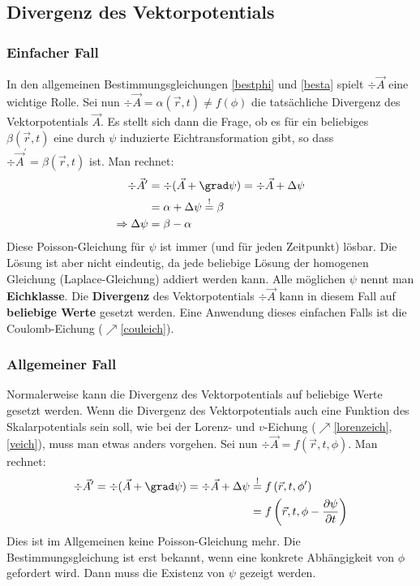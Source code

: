 \subsection{Divergenz des Vektorpotentials}
\subsubsection{Einfacher Fall}
In den allgemeinen Bestimmungsgleichungen \ref{bestphi} und \ref{besta} spielt $\div \vec{{A}}$ eine wichtige Rolle. Sei nun $\div \vec{{A}}=\alpha(\vec{{r}}, {t})\neq f(\phi)$ die tatsächliche Divergenz des Vektorpotentials $\vec{{A}}$. Es stellt sich dann die Frage, ob es für ein beliebiges $\beta(\vec{r}, t)$ eine durch $\psi$ induzierte Eichtransformation gibt, so dass $\div \vec{{A}}^{\prime}=\beta(\vec{{r}}, {t})$ ist. Man rechnet:
$$
\begin{aligned}
	 \div \vec{{A}}^{\prime}&=\div(\vec{{A}}+\grad \psi)=\div \vec{{A}}+\Delta \psi \\
	& =\alpha +\Delta \psi  \stackrel{!}{=} \beta \\
	 \Rightarrow \Delta \psi&=\beta-\alpha
\end{aligned}
$$
Diese Poisson-Gleichung für $\psi$ ist immer (und für jeden Zeitpunkt) lösbar. Die Lösung ist aber nicht eindeutig, da jede beliebige Lösung der homogenen Gleichung (Laplace-Gleichung) addiert werden kann. Alle möglichen $\psi$ nennt man \textbf{Eichklasse}. Die \textbf{Divergenz} des Vektorpotentials $\div \vec{A}$ kann in diesem Fall auf \textbf{beliebige Werte} gesetzt werden. Eine Anwendung dieses einfachen Falls ist die Coulomb-Eichung ($\nearrow$\ref{couleich}).
\subsubsection{Allgemeiner Fall}
Normalerweise kann die Divergenz des Vektorpotentials auf beliebige Werte gesetzt werden. Wenn die Divergenz des Vektorpotentials auch eine Funktion des Skalarpotentials sein soll, wie bei der Lorenz- und $v$-Eichung ($\nearrow$\ref{lorenzeich},\ref{veich}), muss man etwas anders vorgehen. Sei nun $\div \vec{A}=f(\vec{r}, t, \phi)$. Man rechnet:
\begin{align*}
	 \div \vec{{A}}^{\prime}=\div(\vec{{A}}+\grad \psi)=\div \vec{{A}}+\Delta \psi &\stackrel{!}{=} {f}\left(\vec{{r}}, {t}, \phi^{\prime}\right) \\
	&={f}\left(\vec{{r}}, {t}, \phi-\frac{\partial \psi}{\partial {t}}\right) 
\end{align*}
Dies ist im Allgemeinen keine Poisson-Gleichung mehr. Die Bestimmungsgleichung ist erst bekannt, wenn eine konkrete Abhängigkeit von $\phi$ gefordert wird. Dann muss die Existenz von $\psi$ gezeigt werden.

